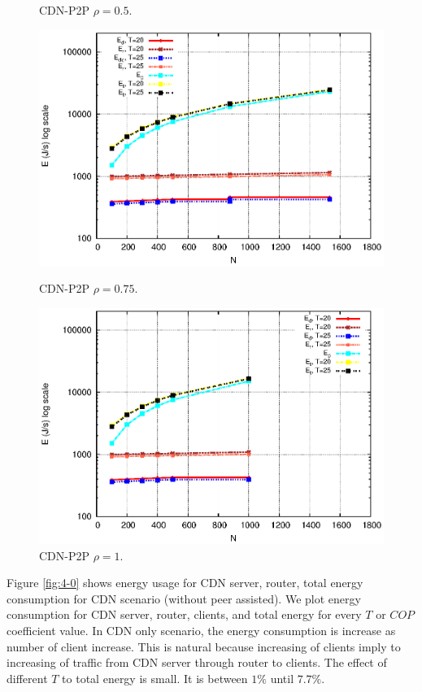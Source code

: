 \documentclass[JIP]{ipsj}
\begin{document}
\begin{figure}[t]
\begin{minipage}[b]{0.3\linewidth}
	\caption{CDN-P2P $\rho=0.5$.}
	\label{fig:4-2}
\end{minipage}
\hfill
\begin{minipage}[b]{0.35\linewidth}
	\includegraphics[scale=0.5]{graphs/cdnp2p-3.eps}
	\caption{CDN-P2P $\rho=0.75$.}
	\label{fig:4-3}
\end{minipage}
\hfill
\begin{minipage}[b]{0.35\linewidth}
	\includegraphics[scale=0.5]{graphs/cdnp2p-4.eps}
	\caption{CDN-P2P $\rho=1$.}
	\label{fig:4-4}
\end{minipage}
\label{fig:main}
\end{figure}

Figure \ref{fig:4-0} shows energy usage for CDN server, router, total energy consumption for CDN scenario (without peer assisted).
We plot energy consumption for CDN server, router, clients, and total energy for every $T$ or $COP$ coefficient value.
In CDN only scenario, the energy consumption is increase as number of client increase.  
This is natural because increasing of clients imply to increasing of traffic from CDN server through router to clients.
The effect of different $T$ to total energy is small.  
It is between $1\%$ until $7.7\%$.
\end{document}

